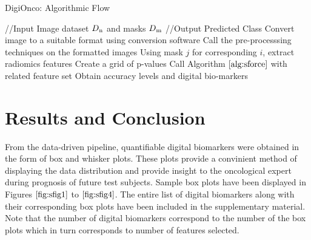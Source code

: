 \documentclass[10pt,journal,compsoc]{IEEEtran}
\begin{document}
\begin{algorithm}[!t]
\caption{DigiOnco: Algorithmic Flow}\label{main}
\begin{algorithmic}[1]
\footnotesize
\STATE //Input Image dataset $D\textsubscript{n}$ and masks $D\textsubscript{m}$ 
\STATE //Output Predicted Class
\STATE Convert image to a suitable format using conversion software
\STATE Call the pre-processsing techniques on the formatted images
\STATE Using mask $j$ for corresponding $i$, extract radiomics features
\STATE Create a grid of p-values
\STATE Call Algorithm $\ref{alg:sforce}$ with related feature set
\ENDFOR
\STATE Obtain accuracy levels and digital bio-markers
\ENDFOR
\end{algorithmic}
\end{algorithm}

\section{Results and Conclusion}

From the data-driven pipeline, quantifiable digital biomarkers were obtained in the form of box and whisker plots. These plots provide a convinient method of displaying the data distribution and provide insight to the oncological expert during prognosis of future test subjects. Sample box plots have been displayed in Figures $\ref{fig:sfig1}$ to $\ref{fig:sfig4}$. The entire list of digital biomarkers along with their corresponding box plots have been included in the supplementary material. Note that the number of digital biomarkers correspond to the number of the box plots which in turn corresponds to number of features selected. 
\end{document}

